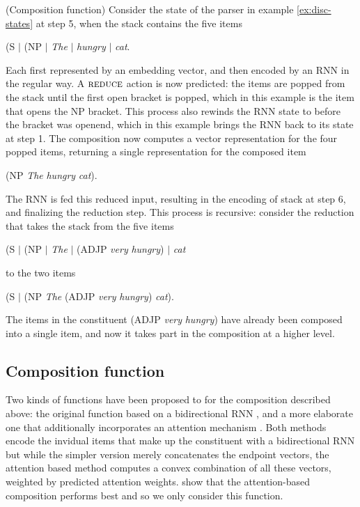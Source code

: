 \begin{example}{(Composition function)}
  Consider the state of the parser in example \ref{ex:disc-states} at step 5, when the stack contains the five items
  \begin{center}
    (S $\mid$ (NP $\mid$ \textit{The} $\mid$ \textit{hungry} $\mid$ \textit{cat}.
  \end{center}
  Each first represented by an embedding vector, and then encoded by an RNN in the regular way. A $\textsc{reduce}$ action is now predicted: the items are popped from the stack until the first open bracket is popped, which in this example is the item that opens the NP bracket. This process also rewinds the RNN state to before the bracket was openend, which in this example brings the RNN back to its state at step 1. The composition now computes a vector representation for the four popped items, returning a single representation for the composed item
  \begin{center}
    (NP \textit{The} \textit{hungry} \textit{cat}).
  \end{center}
  The RNN is fed this reduced input, resulting in the encoding of stack at step 6, and finalizing the reduction step. This process is recursive: consider the reduction that takes the stack from the five items
  \begin{center}
    (S $\mid$ (NP $\mid$ \textit{The} $\mid$ (ADJP \textit{very} \textit{hungry}) $\mid$ \textit{cat}
  \end{center}
  to the two items
  \begin{center}
    (S $\mid$ (NP \textit{The} (ADJP \textit{very} \textit{hungry}) \textit{cat}).
  \end{center}
  The items in the constituent (ADJP \textit{very} \textit{hungry}) have already been composed into a single item, and now it takes part in the composition at a higher level.
\end{example}

\subsection{Composition function}
Two kinds of functions have been proposed to for the composition described above: the original function based on a bidirectional RNN \citep{dyer2016rnng}, and a more elaborate one that additionally incorporates an attention mechanism \citep{kuncoro2017syntax}. Both methods encode the invidual items that make up the constituent with a bidirectional RNN but while the simpler version merely concatenates the endpoint vectors, the attention based method computes a convex combination of all these vectors, weighted by predicted attention weights. \citet{kuncoro2017syntax} show that the attention-based composition performs best and so we only consider this function.

